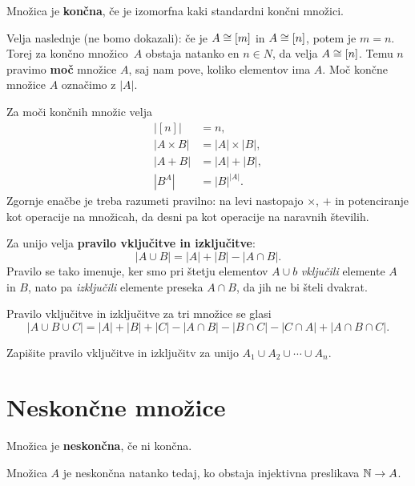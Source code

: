\begin{definicija}
  Množica je \textbf{končna}, če je izomorfna kaki standardni končni množici.
\end{definicija}


Velja naslednje (ne bomo dokazali): če je $A \cong [m]$ in $A \cong [n]$, potem je $m = n$. Torej za končno
množico~$A$ obstaja natanko en $n \in N$, da velja $A \cong [n]$. Temu $n$ pravimo \textbf{moč} množice $A$,
saj nam pove, koliko elementov ima $A$. Moč končne množice $A$ označimo z $|A|$.

Za moči končnih množic velja
%
\begin{align*}
  |[n]| &= n, \\
  |A \times B| &= |A| \times |B|, \\
  |A + B| &= |A| + |B|, \\
  |B^A| &= |B|^|A|.
\end{align*}
%
Zgornje enačbe je treba razumeti pravilno: na levi nastopajo $\times$, $+$ in potenciranje kot operacije na množicah, da desni pa kot operacije na naravnih številih.

Za unijo velja \textbf{pravilo vključitve in izključitve}:
%
\begin{equation*}
 |A \cup B| = |A| + |B| - |A \cap B|.
\end{equation*}
%
Pravilo se tako imenuje, ker smo pri štetju elementov $A \cup b$ \emph{vključili} elemente $A$ in $B$, nato pa \emph{izključili} elemente preseka $A \cap B$, da jih ne bi šteli dvakrat.

Pravilo vključitve in izključitve za tri množice se glasi
%
\begin{equation*}
  |A \cup B \cup C| = |A| + |B| + |C| - |A \cap B| - |B \cap C| - |C \cap A| + |A \cap B \cap C|.
\end{equation*}

\begin{naloga}
  Zapišite pravilo vključitve in izključitv za unijo $A_1 \cup A_2 \cup \cdots \cup A_n$.
\end{naloga}


\section{Neskončne množice}

\begin{definicija}
  Množica je \textbf{neskončna}, če ni končna.
\end{definicija}

\begin{izrek}
  Množica $A$ je neskončna natanko tedaj, ko obstaja injektivna preslikava $\mathbb{N} \to A$.
\end{izrek}

